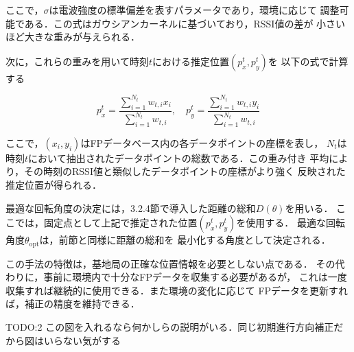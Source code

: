 ここで，$\sigma$は電波強度の標準偏差を表すパラメータであり，環境に応じて
調整可能である．この式はガウシアンカーネルに基づいており，RSSI値の差が
小さいほど大きな重みが与えられる．

次に，これらの重みを用いて時刻$t$における推定位置$(p_x^t, p_y^t)$を
以下の式で計算する

\begin{equation}
p_x^t = \frac{\sum_{i=1}^{N_t} w_{t,i} x_i}{\sum_{i=1}^{N_t} w_{t,i}}, \quad
p_y^t = \frac{\sum_{i=1}^{N_t} w_{t,i} y_i}{\sum_{i=1}^{N_t} w_{t,i}}
\end{equation}

ここで，$(x_i, y_i)$はFPデータベース内の各データポイントの座標を表し，
$N_t$は時刻$t$において抽出されたデータポイントの総数である．この重み付き
平均により，その時刻のRSSI値と類似したデータポイントの座標がより強く
反映された推定位置が得られる．

最適な回転角度の決定には，3.2.4節で導入した距離の総和$D(\theta)$を用いる．
ここでは，固定点として上記で推定された位置$(p_x^t, p_y^t)$を使用する．
最適な回転角度$\theta_{\mathrm{opt}}$は，前節と同様に距離の総和を
最小化する角度として決定される．

この手法の特徴は，基地局の正確な位置情報を必要としない点である．
その代わりに，事前に環境内で十分なFPデータを収集する必要があるが，
これは一度収集すれば継続的に使用できる．また環境の変化に応じて
FPデータを更新すれば，補正の精度を維持できる．


TODO:2 この図を入れるなら何かしらの説明がいる．同じ初期進行方向補正だから図はいらない気がする


